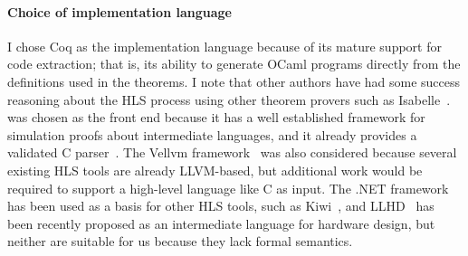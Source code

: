 

\paragraph{Choice of implementation language}

I chose Coq as the implementation language because of its mature support for
code extraction; that is, its ability to generate OCaml programs directly from
the definitions used in the theorems.  I note that other authors have had some
success reasoning about the HLS process using other theorem provers such as
Isabelle~\cite{ellis08_csicgfu}.
\compcert{}~\cite{leroy09_formal_verif_realis_compil} was chosen as the front
end because it has a well established framework for simulation proofs about
intermediate languages, and it already provides a validated C
parser~\cite{jourdan12_valid_lr_parser}.  The Vellvm
framework~\cite{zhao12_formal_llvm_inter_repres_verif_progr_trans} was also
considered because several existing HLS tools are already LLVM-based, but
additional work would be required to support a high-level language like C as
input.  The .NET framework has been used as a basis for other HLS tools, such as
Kiwi~\cite{greaves08_kiwi}, and LLHD~\cite{schuiki20_llhd} has been recently
proposed as an intermediate language for hardware design, but neither are
suitable for us because they lack formal semantics.

